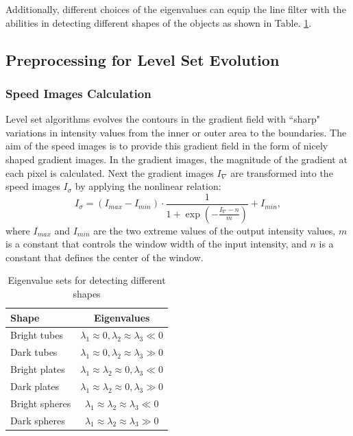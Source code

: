 Additionally, different choices of the eigenvalues can equip the line filter with the abilities in detecting different shapes of the objects as shown in Table. \ref{tbl:Eigenvalues}. %

\subsection{Preprocessing for Level Set Evolution}

\subsubsection{Speed Images Calculation}

Level set algorithms evolves the contours in the gradient field with ``sharp" variations in intensity values from the inner or outer area to the boundaries.
The aim of the speed images is to provide this gradient field in the form of nicely shaped gradient images.
In the gradient images, the magnitude of the gradient at each pixel is calculated.
Next the gradient images $I_{\nabla}$ are transformed into the speed images $I_{\sigma}$ by applying the nonlinear relation:
\begin{equation}
\label{eqn:Sigmoid}
I_{\sigma} = (I_{max} - I_{min}) \cdot \frac{1}{1 + \exp\left(-\frac{I_{\nabla} - n}{m}\right)} + I_{min},
\end{equation}
where $I_{max}$ and $I_{min}$ are the two extreme values of the output intensity values, $m$ is a constant that controls the window width of the input intensity, and $n$ is a constant that defines the center of the window.
\begin{table}
\renewcommand{\arraystretch}{1.3}
\caption{Eigenvalue sets for detecting different shapes}
\label{tbl:Eigenvalues}
\centering
\begin{tabular}{l||c}
\hline
\bfseries Shape & \bfseries Eigenvalues \\
\hline\hline
Bright tubes   & $\lambda_1 \approx 0, \lambda_2 \approx \lambda_3 \ll 0$ \\
Dark tubes     & $\lambda_1 \approx 0, \lambda_2 \approx \lambda_3 \gg 0$ \\
Bright plates  & $\lambda_1 \approx \lambda_2 \approx 0, \lambda_3 \ll 0$ \\
Dark plates    & $\lambda_1 \approx \lambda_2 \approx 0, \lambda_3 \gg 0$ \\
Bright spheres & $\lambda_1 \approx \lambda_2 \approx \lambda_3 \ll 0$ \\
Dark spheres   & $\lambda_1 \approx \lambda_2 \approx \lambda_3 \gg 0$ \\
\hline
\end{tabular}
\end{table}


